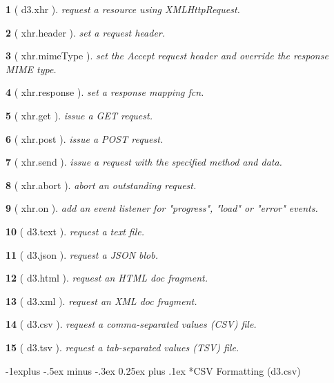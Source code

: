 \documentclass[10pt,landscape,letterpaper]{article}
\makeatletter
\newcounter{thm}
\newcommand{\hdrule}{\vspace{-4pt} \hdashrule[0.25ex]{\fill}{.5pt}{1pt}\vspace{-4pt}}
\theoremstyle{mytheoremstyle}
\newtheorem*{thm}{}
\renewcommand{\subsection}{\@startsection{subsection}{2}{0mm}%
                                {-1explus -.5ex minus -.3ex}%
                                {0.25ex plus .1ex}%
                                {\normalfont\normalsize\bfseries}}
\makeatother
\begin{document}
\begin{multicols}{3}
\begin{thm} [ d3.xhr ]  request a resource using XMLHttpRequest.
\end{thm}\begin{thm} [ xhr.header ]  set a request header.
\end{thm}\begin{thm} [ xhr.mimeType ]  set the Accept request header and override the response MIME type.
\end{thm}\begin{thm} [ xhr.response ]  set a response mapping fcn.
\end{thm}\begin{thm} [ xhr.get ]  issue a GET request.
\end{thm}\begin{thm} [ xhr.post ]  issue a POST request.
\end{thm}\begin{thm} [ xhr.send ]  issue a request with the specified method and data.
\end{thm}\begin{thm} [ xhr.abort ]  abort an outstanding request.
\end{thm}\begin{thm} [ xhr.on ]  add an event listener for "progress", "load" or "error" events.
\end{thm}\begin{thm} [ d3.text ]  request a text file.
\end{thm}\begin{thm} [ d3.json ]  request a JSON blob.
\end{thm}\begin{thm} [ d3.html ]  request an HTML doc fragment.
\end{thm}\begin{thm} [ d3.xml ]  request an XML doc fragment.
\end{thm}\begin{thm} [ d3.csv ]  request a comma-separated values (CSV) file.
\end{thm}\begin{thm} [ d3.tsv ]  request a tab-separated values (TSV) file.\end{thm}
\hdrule

\subsection*{CSV Formatting (d3.csv)}


\end{multicols}
\end{document}
